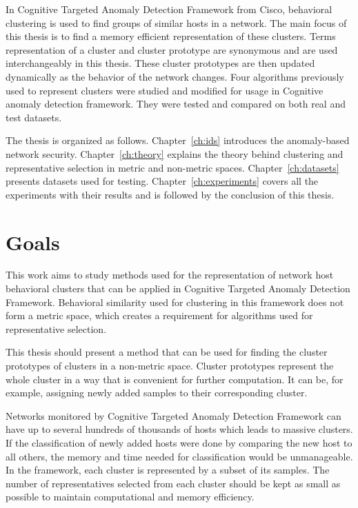\documentclass[thesis=B,english]{FITthesis}[2012/10/20]
\begin{document}
In Cognitive Targeted Anomaly Detection Framework from Cisco, behavioral clustering is used to find groups of similar hosts in a network.
The main focus of this thesis is to find a memory efficient representation of these clusters.
Terms representation of a cluster and cluster prototype are synonymous and are used interchangeably in this thesis. 
These cluster prototypes are then updated dynamically as the behavior of the network changes.
Four algorithms previously used to represent clusters were studied and modified for usage in Cognitive anomaly detection framework.
They were tested and compared on both real and test datasets.

The thesis is organized as follows.
Chapter~\ref{ch:ids} introduces the anomaly-based network security.
Chapter~\ref{ch:theory} explains the theory behind clustering and representative selection in metric and non-metric spaces.
Chapter~\ref{ch:datasets} presents datasets used for testing.
Chapter~\ref{ch:experiments} covers all the experiments with their results and is followed by the conclusion of this thesis.


\chapter{Goals}

This work aims to study methods used for the representation of network host behavioral clusters that can be applied in Cognitive Targeted Anomaly Detection Framework.
Behavioral similarity used for clustering in this framework does not form a metric space, which creates a requirement for algorithms used for representative selection.

This thesis should present a method that can be used for finding the cluster prototypes of clusters in a non-metric space.
Cluster prototypes represent the whole cluster in a way that is convenient for further computation.
It can be, for example, assigning newly added samples to their corresponding cluster.

Networks monitored by Cognitive Targeted Anomaly Detection Framework can have up to several hundreds of thousands of hosts which leads to massive clusters.
If the classification of newly added hosts were done by comparing the new host to all others, the memory and time needed for classification would be unmanageable.
In the framework, each cluster is represented by a subset of its samples.
The number of representatives selected from each cluster should be kept as small as possible to maintain computational and memory efficiency.
\end{document}
